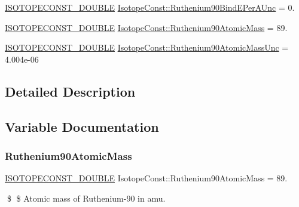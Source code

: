 \begin{DoxyCompactItemize}
\mbox{\hyperlink{group___isotope_const-_macros_ga8f45a7272ce02c0b4c65c44636ed719a}{I\+S\+O\+T\+O\+P\+E\+C\+O\+N\+S\+T\+\_\+\+D\+O\+U\+B\+LE}} \mbox{\hyperlink{group___isotope_const-_ruthenium-_ru90_gae73b6d67f05fc93cf2e02db3ff9dff45}{Isotope\+Const\+::\+Ruthenium90\+Bind\+E\+Per\+A\+Unc}} = 0.
\item 
\mbox{\hyperlink{group___isotope_const-_macros_ga8f45a7272ce02c0b4c65c44636ed719a}{I\+S\+O\+T\+O\+P\+E\+C\+O\+N\+S\+T\+\_\+\+D\+O\+U\+B\+LE}} \mbox{\hyperlink{group___isotope_const-_ruthenium-_ru90_gab117613e2a4f277a53d3ba1eaeba2a94}{Isotope\+Const\+::\+Ruthenium90\+Atomic\+Mass}} = 89.
\item 
\mbox{\hyperlink{group___isotope_const-_macros_ga8f45a7272ce02c0b4c65c44636ed719a}{I\+S\+O\+T\+O\+P\+E\+C\+O\+N\+S\+T\+\_\+\+D\+O\+U\+B\+LE}} \mbox{\hyperlink{group___isotope_const-_ruthenium-_ru90_ga6d0d00a6e9d9db190a597c5d3329e1e8}{Isotope\+Const\+::\+Ruthenium90\+Atomic\+Mass\+Unc}} = 4.\+004e-\/06
\end{DoxyCompactItemize}


\subsection{Detailed Description}


\subsection{Variable Documentation}
\mbox{\label{group___isotope_const-_ruthenium-_ru90_gab117613e2a4f277a53d3ba1eaeba2a94}} 
\subsubsection{\texorpdfstring{Ruthenium90\+Atomic\+Mass}{Ruthenium90AtomicMass}}
{\footnotesize\ttfamily \mbox{\hyperlink{group___isotope_const-_macros_ga8f45a7272ce02c0b4c65c44636ed719a}{I\+S\+O\+T\+O\+P\+E\+C\+O\+N\+S\+T\+\_\+\+D\+O\+U\+B\+LE}} Isotope\+Const\+::\+Ruthenium90\+Atomic\+Mass = 89.}

\$ \$ Atomic mass of Ruthenium-\/90 in amu. \mbox{\label{group___isotope_const-_ruthenium-_ru90_ga6d0d00a6e9d9db190a597c5d3329e1e8}} 
